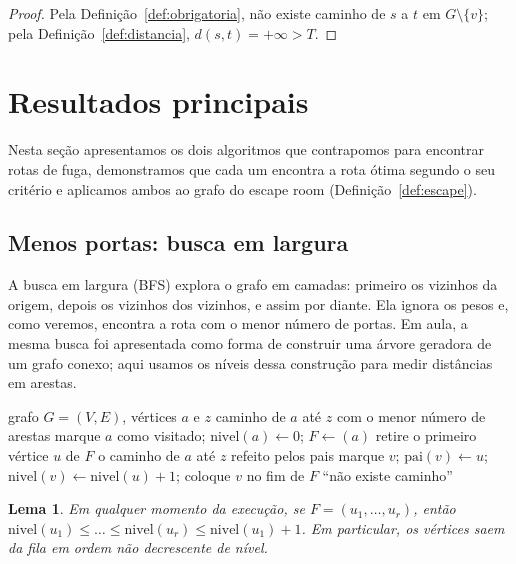 \documentclass{article}
\theoremstyle{definition}
\theoremstyle{plain}
\newtheorem{lema}[definicao]{Lema}
\begin{document}
\begin{proof}
Pela Definição~\ref{def:obrigatoria}, não existe caminho de $s$ a $t$ em
$G \setminus \{v\}$; pela Definição~\ref{def:distancia}, $d(s,t) = +\infty > T$.
\end{proof}

\section{Resultados principais}\label{sec:resultados}

Nesta seção apresentamos os dois algoritmos que contrapomos para encontrar rotas
de fuga, demonstramos que cada um encontra a rota ótima segundo o seu critério e
aplicamos ambos ao grafo do escape room (Definição~\ref{def:escape}).

\subsection{Menos portas: busca em largura}

A busca em largura (BFS) explora o grafo em camadas: primeiro os vizinhos da
origem, depois os vizinhos dos vizinhos, e assim por diante. Ela ignora os pesos
e, como veremos, encontra a rota com o menor número de portas. Em aula, a mesma
busca foi apresentada como forma de construir uma árvore geradora de um grafo
conexo; aqui usamos os níveis dessa construção para medir distâncias em arestas.

\begin{algorithm}[H]
\caption{Busca em largura de $a$ até $z$}\label{alg:bfs}
\begin{algorithmic}[1]
\Require grafo $G=(V,E)$, vértices $a$ e $z$
\Ensure caminho de $a$ até $z$ com o menor número de arestas
\State marque $a$ como visitado; $\mathrm{nivel}(a) \gets 0$; $F \gets (a)$ 
    \State retire o primeiro vértice $u$ de $F$
        \Return o caminho de $a$ até $z$ refeito pelos pais
    \EndIf
        \State marque $v$; $\mathrm{pai}(v) \gets u$; $\mathrm{nivel}(v) \gets \mathrm{nivel}(u)+1$; coloque $v$ no fim de $F$
    \EndFor
\EndWhile
\State \Return ``não existe caminho''
\end{algorithmic}
\end{algorithm}

\begin{lema}\label{lem:fila}
Em qualquer momento da execução, se $F = (u_1, \dots, u_r)$, então
$\mathrm{nivel}(u_1) \le \dots \le \mathrm{nivel}(u_r) \le \mathrm{nivel}(u_1) + 1$.
Em particular, os vértices saem da fila em ordem não decrescente de nível.
\end{lema}
\end{document}
